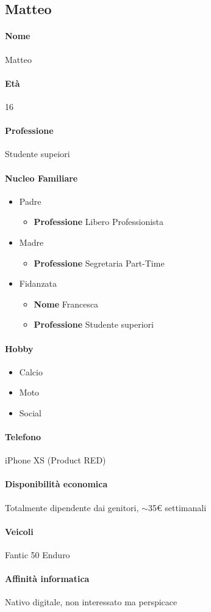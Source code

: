 \documentclass[../../UUX_Personas.tex]{subfiles}
\begin{document}
	\subsection{Matteo}
	\paragraph{Nome} Matteo
	\paragraph{Età} 16
	\paragraph{Professione} Studente supeiori
	\paragraph{Nucleo Familiare}
	\begin{itemize}
		\item Padre
		\begin{itemize} 
			\item \textbf{Professione} Libero Professionista 
		\end{itemize}
		\item Madre
		\begin{itemize}
			\item \textbf{Professione} Segretaria Part-Time 
		\end{itemize}
		\item Fidanzata
		\begin{itemize}
			\item \textbf{Nome} Francesca
			\item \textbf{Professione} Studente superiori  
		\end{itemize}
	\end{itemize}
	\paragraph{Hobby}
	\begin{itemize}
		\item Calcio
		\item Moto
		\item Social
	\end{itemize}
	\paragraph{Telefono} iPhone XS (Product RED\texttrademark)
	\paragraph{Disponibilità economica} Totalmente dipendente dai genitori, \(\sim\)35€ settimanali
	\paragraph{Veicoli} Fantic 50 Enduro
	\paragraph{Affinità informatica} Nativo digitale, non interessato ma perspicace
\end{document}
